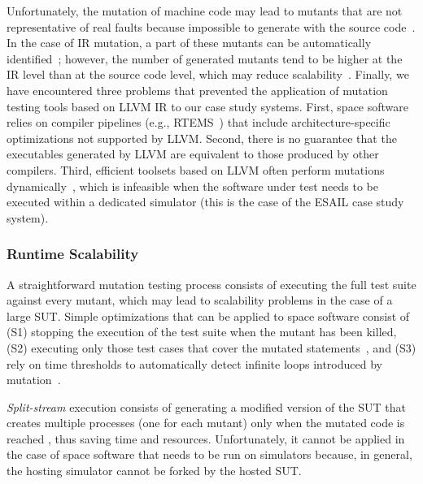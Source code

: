 Unfortunately, the mutation of machine code 
may lead to mutants that are not representative of real faults because impossible to generate with the source code~\cite{schuler2009efficient}.
In the case of IR mutation, a part of these mutants can be automatically identified~\cite{denisov2018mull}; however,
the number of generated mutants tend to be higher at the IR level than at the source code level, which may reduce scalability~\cite{hariri2019comparing}.
 Finally, we have encountered three problems that prevented the application of 
 mutation testing tools based on  LLVM IR to our case study systems.
First, space software relies on compiler pipelines (e.g., RTEMS~\cite{RTEMS}) that include architecture-specific optimizations not supported by LLVM. 
Second, there is no guarantee that the executables generated by LLVM are equivalent to those produced by other compilers.
 Third, efficient toolsets based on LLVM often  perform mutations dynamically~\cite{denisov2018mull}, which is infeasible when the software under test needs to be executed within a dedicated simulator (this is the case of the ESAIL case study system).




\subsubsection{Runtime Scalability}
\label{sec:scalability}

A straightforward mutation testing process consists of executing the full test suite against every mutant, which may lead to scalability problems in the case of a large SUT.
Simple optimizations that can be applied to space software consist of (S1) stopping the execution of the test suite when the mutant has been killed, (S2) executing only those test cases that cover the mutated statements~\cite{delamaro1996proteum}, and (S3) rely on time thresholds to automatically detect infinite loops introduced by mutation~\cite{papadakis2019mutation}. 

\emph{Split-stream} execution consists of generating a modified version of the SUT that creates multiple processes (one for each mutant) only when the mutated code is reached \cite{king1991fortran,tokumoto2016muvm}, thus saving time and resources. Unfortunately, it cannot be applied in the case of space software that needs to be run on simulators because, in general, the hosting simulator cannot be forked by the hosted SUT.

